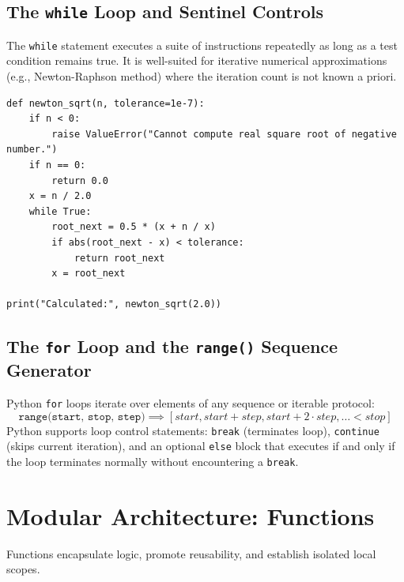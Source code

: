 \subsection{The \texttt{while} Loop and Sentinel Controls}
The \texttt{while} statement executes a suite of instructions repeatedly as long as a test condition remains true. It is well-suited for iterative numerical approximations (e.g., Newton-Raphson method) where the iteration count is not known a priori.

\begin{lstlisting}[caption={Newton-Raphson Square Root Approximation}]
def newton_sqrt(n, tolerance=1e-7):
    if n < 0:
        raise ValueError("Cannot compute real square root of negative number.")
    if n == 0:
        return 0.0
    x = n / 2.0
    while True:
        root_next = 0.5 * (x + n / x)
        if abs(root_next - x) < tolerance:
            return root_next
        x = root_next

print("Calculated:", newton_sqrt(2.0))
\end{lstlisting}

\subsection{The \texttt{for} Loop and the \texttt{range()} Sequence Generator}
Python \texttt{for} loops iterate over elements of any sequence or iterable protocol:
\begin{equation}
\texttt{range(start, stop, step)} \implies [start, start+step, start+2\cdot step, \dots < stop]
\end{equation}
Python supports loop control statements: \texttt{break} (terminates loop), \texttt{continue} (skips current iteration), and an optional \texttt{else} block that executes if and only if the loop terminates normally without encountering a \texttt{break}.

\section{Modular Architecture: Functions}

Functions encapsulate logic, promote reusability, and establish isolated local scopes.

